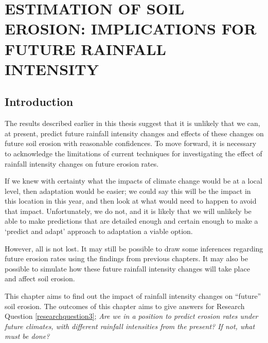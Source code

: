 \chapter{ESTIMATION OF SOIL EROSION: IMPLICATIONS FOR FUTURE RAINFALL
INTENSITY}
\label{sec:ESTIMATIONSOFFUTURESOILEROSION}

\section{Introduction}
\label{sec:FutureSoilErosionIntroduction}

The results described earlier in this thesis suggest that it is unlikely that
we can, at present, predict future rainfall intensity changes and effects of
these changes on future soil erosion with reasonable confidences. To move
forward, it is necessary to acknowledge the limitations of current techniques
for investigating the effect of rainfall intensity changes on future erosion
rates.

If we knew with certainty what the impacts of climate change would be at a local
level, then adaptation would be easier; we could say this will be the impact in
this location in this year, and then look at what would need to happen to avoid
that impact. Unfortunately, we do not, and it is likely that we will unlikely be
able to make predictions that are detailed enough and certain enough to make a
`predict and adapt' approach to adaptation a viable option.

However, all is not lost. It may still be possible to draw some inferences
regarding future erosion rates using the findings from previous chapters. It may
also be possible to simulate how these future rainfall intensity changes will
take place and affect soil erosion.

This chapter aims to find out the impact of rainfall intensity changes on
``future'' soil erosion. The outcomes of this chapter aims to give answers for
Research Question \ref{researchquestion3}; \textit{Are we in a position to
predict erosion rates under future climates, with different rainfall intensities
from the present? If not, what must be done?}


